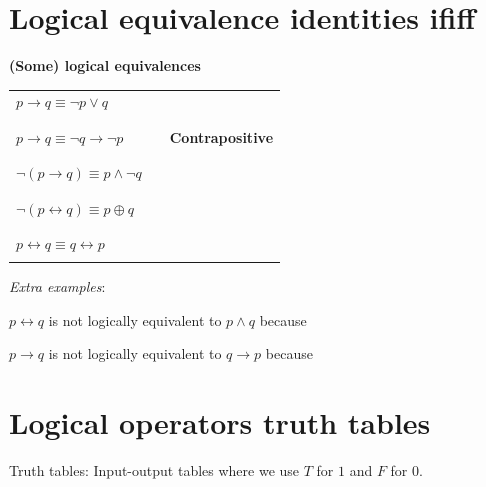 \documentclass[12pt, oneside]{article}
\begin{document}
\begin{flushright}
\end{flushright} \section*{Logical equivalence identities ififf}


{\bf (Some) logical equivalences}

\begin{tabular}{llp{3in}}
$p \to q \equiv \lnot p \lor q$ & & \\
&& \\
&& \\
$p \to q \equiv \lnot q \to \lnot p$ & &{\bf Contrapositive} \\
&& \\
&& \\
$\lnot (p \to q) \equiv p\land \lnot q$  & &\\
&& \\
&& \\
$\lnot( p \leftrightarrow q) \equiv p \oplus q$ && \\
&& \\
&& \\
$p \leftrightarrow q \equiv q \leftrightarrow p$ &&\\
&& \\
\end{tabular}

\vfill

{\it Extra examples}:

$p \leftrightarrow q$ is not logically equivalent to $p \land q$ because \underline{\phantom{\hspace{4in}}} 

$p \to q$ is not logically equivalent to $q \to p$ because \underline{\phantom{\hspace{4in}}} 
\vfill
 \vfill
\section*{Logical operators truth tables}


Truth tables: Input-output tables where we use $T$ for $1$ and $F$ for $0$.
\end{document}
